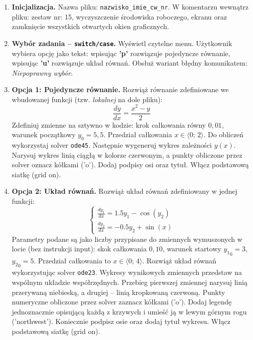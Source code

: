 \documentclass[a4paper,11pt]{article}
\begin{document}
\begin{enumerate}[leftmargin=*, label=\textbf{\arabic*.}, itemsep=2pt]

  \item \textbf{Inicjalizacja.}
    Nazwa pliku: \texttt{nazwisko\_imie\_cw\_nr}. W komentarzu wewnątrz pliku: zestaw nr: 15, wyczyszczenie środowiska roboczego, ekranu oraz zamknięcie wszystkich otwartych okien graficznych.

  \item \textbf{Wybór zadania -- \texttt{switch/case}.}
    Wyświetl czytelne menu. Użytkownik wybiera opcję jako tekst: wpisując \textbf{'p'} rozwiązuje pojedyncze równanie, wpisując \textbf{'u'} rozwiązuje układ równań. Obsłuż wariant błędny komunikatem: \textit{Niepoprawny wybór}.

  \item \textbf{Opcja 1: Pojedyncze równanie.}
    Rozwiąż równanie zdefiniowane we wbudowanej funkcji (tzw. \textit{lokalnej} na dole pliku):
    \[ \frac{dy}{dx} = \frac{x^2 - y}{2} \]
    Zdefiniuj zmienne na sztywno w kodzie: krok całkowania równy $0{,}01$, warunek początkowy $y_0 = 5{,}5$. Przedział całkowania $x \in \langle 0;\,2 \rangle$.
    Do obliczeń wykorzystaj solver \texttt{ode45}. Następnie wygeneruj wykres zależności $y(x)$. Narysuj wykres linią ciągłą w kolorze czerwonym, a punkty obliczone przez solver oznacz kółkami ('o'). Dodaj podpisy osi oraz tytuł. Włącz podstawową siatkę (grid on).

  \item \textbf{Opcja 2: Układ równań.}
    Rozwiąż układ równań zdefiniowany w jednej funkcji:\\[-0.5em]
    \[
    \begin{cases}
      \frac{dy_1}{dx} = 1.5y_1 - \cos(y_2) \\
      \frac{dy_2}{dx} = -0.5y_2 + \sin(x)
    \end{cases}
    \]
    Parametry podane są jako liczby przypisane do zmiennych wymuszonych w locie (bez instrukcji input): skok całkowania $0{,}10$, warunek startowy $ {y_1}_{0} = 3 $, $ {y_2}_{0} = 5 $. Przedział całkowania to $x \in \langle 0;\,4 \rangle$.
    Rozwiąż układ równań wykorzystując solver \texttt{ode23}. Wykresy wynikowych zmiennych przedstaw na wspólnym układzie współrzędnych. Przebieg pierwszej zmiennej narysuj linią przerywaną niebieską, a drugiej -- linią kropkowaną czerwoną. Punkty numeryczne obliczone przez solver zaznacz kółkami ('o'). Dodaj legendę jednoznacznie opisującą każdą z krzywych i umieść ją w lewym górnym rogu ('northwest'). Koniecznie podpisz osie oraz dodaj tytuł wykresu. Włącz podstawową siatkę (grid on).

\end{enumerate}
\end{document}
